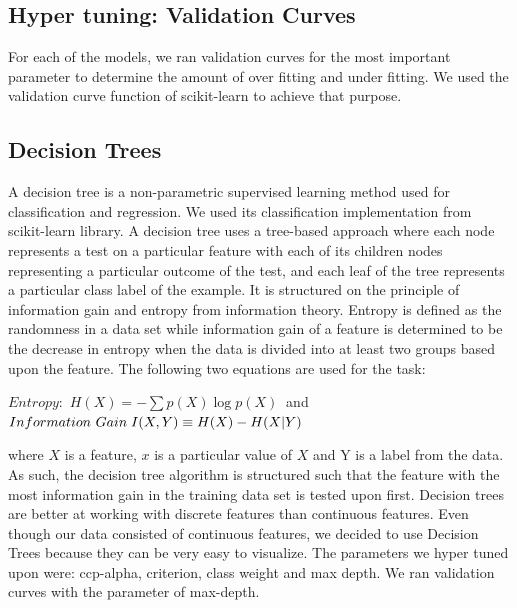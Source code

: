 \documentclass{article}
\begin{document}
\subsection{Hyper tuning: Validation Curves}
\label{Validation curves}
For each of the models, we ran validation curves for the most important parameter to determine the amount of over fitting and under fitting. We used the validation curve function of scikit-learn to achieve that purpose.

\subsection{Decision Trees}
\label{decision trees}
A decision tree is a non-parametric supervised learning method used for classification and regression. We used its classification implementation from scikit-learn library. A decision tree uses a tree-based approach where each node represents a test on a particular feature with each of its children nodes representing a particular outcome of the test, and each leaf of the tree represents a particular class label of the example. It is structured on the principle of information gain and entropy from information theory. Entropy is defined as the randomness in a data set while information gain of a feature is determined to be the decrease in entropy when the data is divided into at least two groups based upon the feature. The following two equations are used for the task:
\begin{center}
$Entropy:$
    $H(X) = -\sum p(X)\log p(X)\ $ \newline
    and $\newline
Information\ Gain\; I(X,Y)\equiv H(X)-H(X|Y)\
$ 
\end{center}
where $X$ is a feature, $x$ is a particular value of $X$ and Y is a label from the data. 
\newline\newline
As such, the decision tree algorithm is structured such that the feature with the most information gain in the training data set is tested upon first. Decision trees are better at working with discrete features than continuous features. Even though our data consisted of continuous features, we decided to use Decision Trees because they can be very easy to visualize. The parameters we hyper tuned upon were: ccp-alpha, criterion, class weight and max depth. We ran validation curves with the parameter of max-depth.
\end{document}
